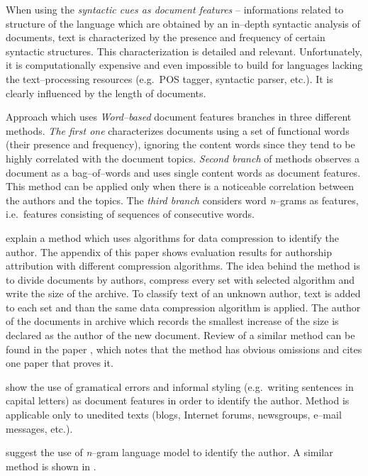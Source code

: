 \documentclass[11pt,english]{article}
\begin{document}
\begin{multicols}{2}
When using the \emph{syntactic cues as document features} -- informations
related to structure of the language which are obtained by an in--depth syntactic
analysis of documents, text is characterized by the presence and frequency of
certain syntactic structures. This characterization is detailed and relevant.
Unfortunately, it is computationally expensive and even impossible to build for
languages lacking the text--processing resources (e.g.\ POS tagger, syntactic
parser, etc.). It is clearly influenced by the length of documents.

Approach which uses \emph{Word--based} document features branches in three
different methods. \emph{The first one} characterizes documents using a set of
functional words (their presence and frequency), ignoring the content words since
they tend to be highly correlated with the document topics. \emph{Second branch}
of methods observes a document as a bag--of--words and uses single content words as
document features. This method can be applied only when there is a noticeable
correlation between the authors and the topics. The \emph{third branch} considers
word \emph{n}--grams as features, i.e.\ features consisting of sequences of
consecutive words.

\citet{kukushkina2001using} explain a method which uses algorithms for data
compression to identify the author. The appendix of this paper shows evaluation results
for authorship attribution with different compression algorithms. The idea behind
the method is to divide documents by authors, compress every set with selected
algorithm and write the size of the archive. To classify text of an unknown author,
text is added to each set and than the same data compression algorithm is applied. The author of
the documents in archive which records the smallest increase of the size is declared
as the author of the new document. Review of a similar method can be found in the
paper \citep{zhao2005effective}, which notes that the method has obvious
omissions and cites one paper that proves it.

\citet{koppel2003exploiting} show the use of gramatical errors and informal
styling (e.g.\ writing sentences in capital letters) as document features in
order to identify the author. Method is applicable only to unedited texts (blogs,
Internet forums, newsgroups, e--mail messages, etc.).

\citet{peng2003language} suggest the use of \emph{n}--gram language model to identify
the author. A similar method is shown in \citep{coyotl2006authorship}.


\end{multicols}
\end{document}
